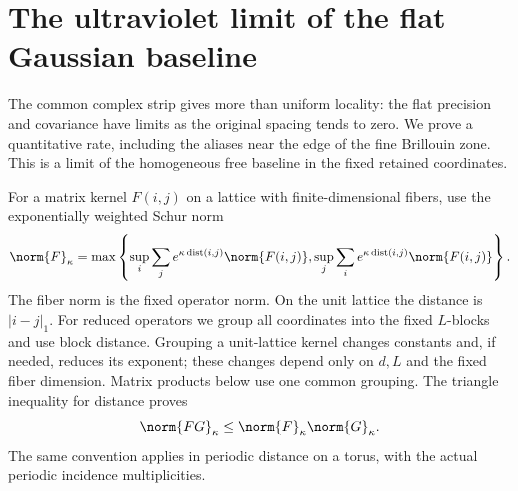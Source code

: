 \section{The ultraviolet limit of the flat Gaussian baseline}
\label{limit-section}

The common complex strip gives more than uniform locality: the flat
precision and covariance have limits as the original spacing tends to
zero. We prove a quantitative rate, including the aliases near the edge
of the fine Brillouin zone. This is a limit of the homogeneous free
baseline in the fixed retained coordinates.

For a matrix kernel $F(i,j)$ on a lattice with finite-dimensional fibers,
use the exponentially weighted Schur norm
\begin{equation}\label{limit-schur-definition}
 \norm{F}_\kappa=
 \max\left\{
 \sup_i\sum_j e^{\kappa\operatorname{dist}(i,j)}\norm{F(i,j)},
 \sup_j\sum_i e^{\kappa\operatorname{dist}(i,j)}\norm{F(i,j)}
 \right\}.
\end{equation}
The fiber norm is the fixed operator norm. On the unit lattice the
distance is $|i-j|_1$. For reduced operators we group all coordinates
into the fixed $L$-blocks and use block distance. Grouping a unit-lattice
kernel changes constants and, if needed, reduces its exponent; these
changes depend only on $d,L$ and the fixed fiber dimension. Matrix
products below use one common grouping. The triangle inequality for
distance proves
\begin{equation}\label{limit-schur-algebra}
 \norm{FG}_\kappa\le\norm{F}_\kappa\norm{G}_\kappa.
\end{equation}
The same convention applies in periodic distance on a torus, with the
actual periodic incidence multiplicities.

